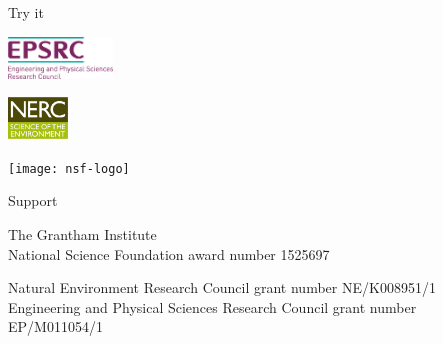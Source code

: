 \documentclass[cmyk,luatex,a0paper,portrait]{baposter}
\begin{document}
\begin{poster}
\begin{posterbox}[name=try, column=3, below=curl-curl,
    span=3, height=0.235]{Try it}
    \vspace{1.4\baselineskip}
    \begin{minipage}{0.166\textwidth}
      \begin{flushleft}
        \includegraphics[align=c,height=3em]{epsrc-logo}
      \end{flushleft}
    \end{minipage}
    \hfill
    \begin{minipage}{0.166\textwidth}
      \begin{center}
        \includegraphics[align=c,height=3em]{nerc-logo}
      \end{center}
    \end{minipage}
    \hfill
    \begin{minipage}{0.166\textwidth}
      \begin{flushright}
        \texttt{[image: nsf-logo]}
      \end{flushright}
    \end{minipage}
  \end{posterbox}
  \begin{posterbox}[name=acknowledgements,
    column=0,span=6,below=future,boxheaderheight=2em,
    height=0.075]{Support}
    \begin{minipage}[t]{0.49\textwidth}
      \raggedright
      \small
      The Grantham Institute\\[0.25\baselineskip]
      National Science Foundation award number 1525697
    \end{minipage}%
    \hspace{0.02\textwidth}%
    \begin{minipage}[t]{0.49\textwidth}
      \raggedright
      \small
      Natural Environment Research Council grant number NE/K008951/1\\[0.25\baselineskip]
      Engineering and Physical Sciences Research Council grant number EP/M011054/1
    \end{minipage}
  \end{posterbox}
\end{poster}
\end{document}
